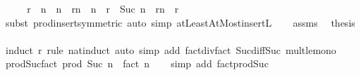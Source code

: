 \begin{isabellebody}
%
\isadelimproof
%
\endisadelimproof
%
\isatagproof
{}\isamarkupfalse%
\ {\isacharminus}{\kern0pt}\isanewline
\ \ \isamarkupfalse%
\ {\isachardoublequoteopen}r\ {\isasymle}\ n\ {\isasymLongrightarrow}\ {\isasymProd}{\isacharbraceleft}{\kern0pt}n\ {\isacharminus}{\kern0pt}\ r{\isachardot}{\kern0pt}{\isachardot}{\kern0pt}n{\isacharbraceright}{\kern0pt}\ {\isacharequal}{\kern0pt}\ {\isacharparenleft}{\kern0pt}n\ {\isacharminus}{\kern0pt}\ r{\isacharparenright}{\kern0pt}\ {\isacharasterisk}{\kern0pt}\ {\isasymProd}{\isacharbraceleft}{\kern0pt}Suc\ {\isacharparenleft}{\kern0pt}n\ {\isacharminus}{\kern0pt}\ r{\isacharparenright}{\kern0pt}{\isachardot}{\kern0pt}{\isachardot}{\kern0pt}n{\isacharbraceright}{\kern0pt}{\isachardoublequoteclose}\ \ r\isanewline
\ \ \ \ \isamarkupfalse%
\ {\isacharparenleft}{\kern0pt}subst\ prod{\isachardot}{\kern0pt}insert{\isacharbrackleft}{\kern0pt}symmetric{\isacharbrackright}{\kern0pt}{\isacharparenright}{\kern0pt}\ {\isacharparenleft}{\kern0pt}auto\ simp{\isacharcolon}{\kern0pt}\ atLeastAtMost{\isacharunderscore}{\kern0pt}insertL{\isacharparenright}{\kern0pt}\isanewline
\ \ \isamarkupfalse%
\ assms\ \isamarkupfalse%
\ {\isacharquery}{\kern0pt}thesis\isanewline
\ \ \ \ \isamarkupfalse%
\ {\isacharparenleft}{\kern0pt}induct\ r\ rule{\isacharcolon}{\kern0pt}\ nat{\isachardot}{\kern0pt}induct{\isacharparenright}{\kern0pt}\ {\isacharparenleft}{\kern0pt}auto\ simp\ add{\isacharcolon}{\kern0pt}\ fact{\isacharunderscore}{\kern0pt}div{\isacharunderscore}{\kern0pt}fact\ Suc{\isacharunderscore}{\kern0pt}diff{\isacharunderscore}{\kern0pt}Suc\ mult{\isacharunderscore}{\kern0pt}le{\isacharunderscore}{\kern0pt}mono{\isacharparenright}{\kern0pt}\isanewline
{}\isamarkupfalse%
%
\endisatagproof
{\isafoldproof}%
%
\isadelimproof
\isanewline
%
\endisadelimproof
\isanewline
{}\isamarkupfalse%
\ prod{\isacharunderscore}{\kern0pt}Suc{\isacharunderscore}{\kern0pt}fact{\isacharcolon}{\kern0pt}\ {\isachardoublequoteopen}prod\ Suc\ {\isacharbraceleft}{\kern0pt}{}{\isachardot}{\kern0pt}{\isachardot}{\kern0pt}{\isacharless}{\kern0pt}n{\isacharbraceright}{\kern0pt}\ {\isacharequal}{\kern0pt}\ fact\ n{\isachardoublequoteclose}\isanewline
%
\isadelimproof
\ \ %
\endisadelimproof
%
\isatagproof
{}\isamarkupfalse%
\ {\isacharparenleft}{\kern0pt}simp\ add{\isacharcolon}{\kern0pt}\ fact{\isacharunderscore}{\kern0pt}prod{\isacharunderscore}{\kern0pt}Suc{\isacharparenright}{\kern0pt}%
\endisatagproof

\end{isabellebody}
